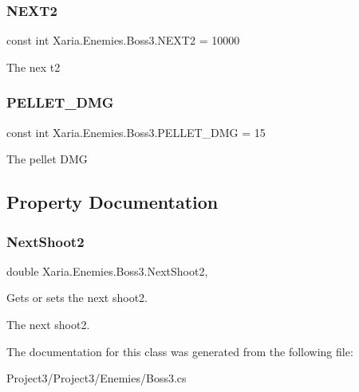 \subsubsection{\texorpdfstring{N\+E\+X\+T2}{NEXT2}}
{\footnotesize\ttfamily const int Xaria.\+Enemies.\+Boss3.\+N\+E\+X\+T2 = 10000\hspace{0.3cm}{\ttfamily [private]}}



The nex t2 

\mbox{\label{classXaria_1_1Enemies_1_1Boss3_ac9d2f8ba2b641fb7b6b3ffc9970fe82a}} 
\subsubsection{\texorpdfstring{P\+E\+L\+L\+E\+T\+\_\+\+D\+MG}{PELLET\_DMG}}
{\footnotesize\ttfamily const int Xaria.\+Enemies.\+Boss3.\+P\+E\+L\+L\+E\+T\+\_\+\+D\+MG = 15\hspace{0.3cm}{\ttfamily [private]}}



The pellet D\+MG 



\subsection{Property Documentation}
\mbox{\label{classXaria_1_1Enemies_1_1Boss3_a82934fbc14963fb958807469ee713987}} 
\subsubsection{\texorpdfstring{Next\+Shoot2}{NextShoot2}}
{\footnotesize\ttfamily double Xaria.\+Enemies.\+Boss3.\+Next\+Shoot2\hspace{0.3cm}{\ttfamily [get]}, {\ttfamily [set]}}



Gets or sets the next shoot2. 

The next shoot2. 

The documentation for this class was generated from the following file\+:\begin{DoxyCompactItemize}
\item 
Project3/\+Project3/\+Enemies/Boss3.\+cs\end{DoxyCompactItemize}

